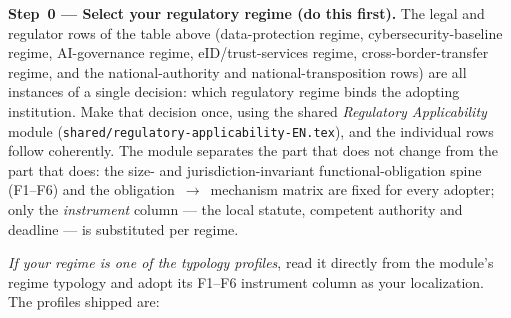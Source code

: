 %

\bigskip
\noindent\textbf{Step~0 --- Select your regulatory regime (do this first).}
The legal and regulator rows of the table above (data-protection regime,
cybersecurity-baseline regime, AI-governance regime, eID/trust-services regime,
cross-border-transfer regime, and the national-authority and
national-transposition rows) are all instances of a single decision: which
regulatory regime binds the adopting institution. Make that decision once,
using the shared \emph{Regulatory Applicability} module
(\texttt{shared/regulatory-applicability-EN.tex}), and the individual rows
follow coherently. The module separates the part that does not change from the
part that does: the size- and jurisdiction-invariant functional-obligation
spine (F1--F6) and the obligation~$\rightarrow$~mechanism matrix are fixed for
every adopter; only the \emph{instrument} column --- the local statute,
competent authority and deadline --- is substituted per regime.

\smallskip
\noindent\emph{If your regime is one of the typology profiles}, read it
directly from the module's regime typology and adopt its F1--F6 instrument
column as your localization. The profiles shipped are:

